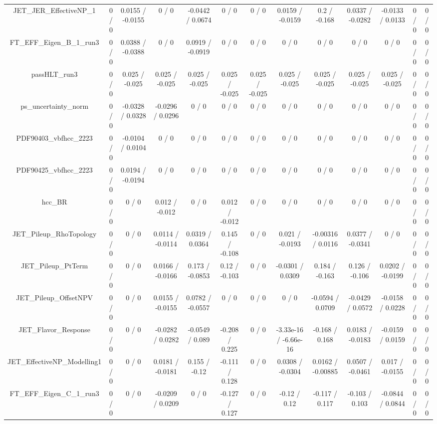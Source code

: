 \documentclass[10pt]{article}
\begin{document}
\begin{table}[htbp]
\begin{center}
\begin{tabular}{|c|c|c|c|c|c|c|c|c|c|c|c|c|}
  JET_JER_EffectiveNP_1 & 0 / 0 & 0.0155 / -0.0155 & 0 / 0 & -0.0442 / 0.0674 & 0 / 0 & 0 / 0 & 0.0159 / -0.0159 & 0.2 / -0.168 & 0.0337 / -0.0282 & -0.0133 / 0.0133 & 0 / 0 & 0 / 0 \\ 
  FT_EFF_Eigen_B_1_run3 & 0 / 0 & 0.0388 / -0.0388 & 0 / 0 & 0.0919 / -0.0919 & 0 / 0 & 0 / 0 & 0 / 0 & 0 / 0 & 0 / 0 & 0 / 0 & 0 / 0 & 0 / 0 \\ 
  passHLT_run3 & 0 / 0 & 0.025 / -0.025 & 0.025 / -0.025 & 0.025 / -0.025 & 0.025 / -0.025 & 0.025 / -0.025 & 0.025 / -0.025 & 0.025 / -0.025 & 0.025 / -0.025 & 0.025 / -0.025 & 0 / 0 & 0 / 0 \\ 
  ps_uncertainty_norm & 0 / 0 & -0.0328 / 0.0328 & -0.0296 / 0.0296 & 0 / 0 & 0 / 0 & 0 / 0 & 0 / 0 & 0 / 0 & 0 / 0 & 0 / 0 & 0 / 0 & 0 / 0 \\ 
  PDF90403_vbfhcc_2223 & 0 / 0 & -0.0104 / 0.0104 & 0 / 0 & 0 / 0 & 0 / 0 & 0 / 0 & 0 / 0 & 0 / 0 & 0 / 0 & 0 / 0 & 0 / 0 & 0 / 0 \\ 
  PDF90425_vbfhcc_2223 & 0 / 0 & 0.0194 / -0.0194 & 0 / 0 & 0 / 0 & 0 / 0 & 0 / 0 & 0 / 0 & 0 / 0 & 0 / 0 & 0 / 0 & 0 / 0 & 0 / 0 \\ 
  hcc_BR & 0 / 0 & 0 / 0 & 0.012 / -0.012 & 0 / 0 & 0.012 / -0.012 & 0 / 0 & 0 / 0 & 0 / 0 & 0 / 0 & 0 / 0 & 0 / 0 & 0 / 0 \\ 
  JET_Pileup_RhoTopology & 0 / 0 & 0 / 0 & 0.0114 / -0.0114 & 0.0319 / 0.0364 & 0.145 / -0.108 & 0 / 0 & 0.021 / -0.0193 & -0.00316 / 0.0116 & 0.0377 / -0.0341 & 0 / 0 & 0 / 0 & 0 / 0 \\ 
  JET_Pileup_PtTerm & 0 / 0 & 0 / 0 & 0.0166 / -0.0166 & 0.173 / -0.0853 & 0.12 / -0.103 & 0 / 0 & -0.0301 / 0.0309 & 0.184 / -0.163 & 0.126 / -0.106 & 0.0202 / -0.0199 & 0 / 0 & 0 / 0 \\ 
  JET_Pileup_OffsetNPV & 0 / 0 & 0 / 0 & 0.0155 / -0.0155 & 0.0782 / -0.0557 & 0 / 0 & 0 / 0 & 0 / 0 & -0.0594 / 0.0709 & -0.0429 / 0.0572 & -0.0158 / 0.0228 & 0 / 0 & 0 / 0 \\ 
  JET_Flavor_Response & 0 / 0 & 0 / 0 & -0.0282 / 0.0282 & -0.0549 / 0.089 & -0.208 / 0.225 & 0 / 0 & -3.33e-16 / -6.66e-16 & -0.168 / 0.168 & 0.0183 / -0.0183 & -0.0159 / 0.0159 & 0 / 0 & 0 / 0 \\ 
  JET_EffectiveNP_Modelling1 & 0 / 0 & 0 / 0 & 0.0181 / -0.0181 & 0.155 / -0.12 & -0.111 / 0.128 & 0 / 0 & 0.0308 / -0.0304 & 0.0162 / -0.00885 & 0.0507 / -0.0461 & 0.017 / -0.0155 & 0 / 0 & 0 / 0 \\ 
  FT_EFF_Eigen_C_1_run3 & 0 / 0 & 0 / 0 & -0.0209 / 0.0209 & 0 / 0 & -0.127 / 0.127 & 0 / 0 & -0.12 / 0.12 & -0.117 / 0.117 & -0.103 / 0.103 & -0.0844 / 0.0844 & 0 / 0 & 0 / 0 \\ 

\end{tabular}
\end{center}
\end{table}
\end{document}
